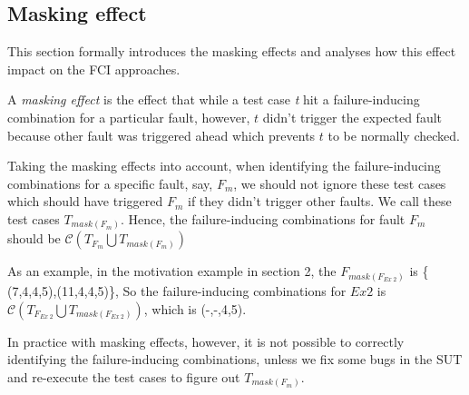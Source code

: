 \documentclass{sig-alternate}
\begin{document}
%

\subsection{Masking effect}
This section formally introduces the masking effects and analyses how this effect impact on the FCI approaches.
\begin{definition}
A \emph{masking effect} is the effect that while a test case \emph{t} hit a failure-inducing combination for a particular fault, however, $t$ didn't trigger the expected fault because other fault was triggered ahead which prevents $t$ to be normally checked.

\end{definition}

Taking the masking effects into account, when identifying the failure-inducing combinations for a specific fault, say, $F_{m}$, we should not ignore these test cases which should have triggered $F_{m}$ if they didn't trigger other faults. We call these test cases $T_{mask(F_{m})}$. Hence, the failure-inducing combinations for fault $F_{m}$ should be $\mathcal{C}(T_{F_{m}} \bigcup T_{mask(F_{m})})$


As an example, in the motivation example in section 2, the $F_{mask(F_{Ex\ 2})}$  is \{ (7,4,4,5),(11,4,4,5)\}, So the failure-inducing combinations for $Ex 2$ is $\mathcal{C}(T_{F_{Ex\ 2}} \bigcup T_{mask(F_{Ex\ 2})})$, which is (-,-,4,5).

In practice with masking effects, however, it is not possible to correctly identifying the failure-inducing combinations, unless we fix some bugs in the SUT and re-execute the test cases to figure out $T_{mask(F_{m})}$.
\end{document}
